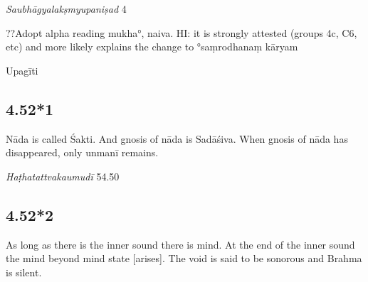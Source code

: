 \begin{ekdosis}
\begin{testimonia}[hp04_052]
\emph{Saubhāgyalakṣmyupaniṣad} 4
\begin{versinnote}
\end{versinnote}
\end{testimonia}

\begin{philcomm}[hp04_052]
??Adopt alpha reading mukha°, naiva. HI: it is strongly attested (groups 4c, C6, etc) and more likely explains the change to °saṃrodhanaṃ kāryam
\end{philcomm}

\begin{metre}[hp04_052]
Upagīti 
\end{metre}

\subsection*{4.52*1}
\begin{translation}[hp04_052_1]
Nāda is called Śakti. And gnosis of nāda is Sadāśiva. When gnosis of nāda has disappeared, only unmanī remains.
\end{translation}


\begin{testimonia}[hp04_052_1]
\emph{Haṭhatattvakaumudī} 54.50
\begin{versinnote}
\end{versinnote}
\end{testimonia}


\subsection*{4.52*2}
\begin{translation}[hp04_052_2]
As long as there is the inner sound there is mind. At the end of the inner sound the mind beyond mind state [arises]. The void is said to be sonorous and Brahma is silent.
\end{translation}


\end{ekdosis}
